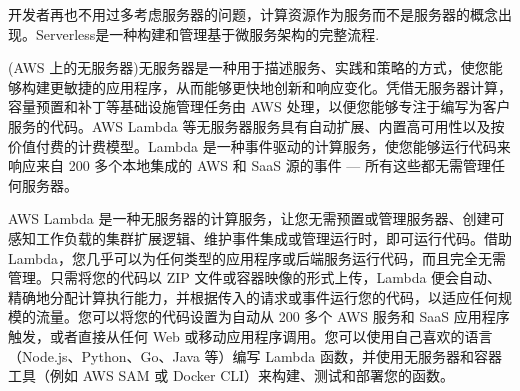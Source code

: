 \begin{definition}[Serverless]
    开发者再也不用过多考虑服务器的问题，计算资源作为服务而不是服务器的概念出现。Serverless是一种构建和管理基于微服务架构的完整流程.

    (AWS 上的无服务器)无服务器是一种用于描述服务、实践和策略的方式，使您能够构建更敏捷的应用程序，从而能够更快地创新和响应变化。凭借无服务器计算，容量预置和补丁等基础设施管理任务由 AWS 处理，以便您能够专注于编写为客户服务的代码。AWS Lambda 等无服务器服务具有自动扩展、内置高可用性以及按价值付费的计费模型。Lambda 是一种事件驱动的计算服务，使您能够运行代码来响应来自 200 多个本地集成的 AWS 和 SaaS 源的事件 — 所有这些都无需管理任何服务器。
\end{definition}

\begin{definition}
    AWS Lambda 是一种无服务器的计算服务，让您无需预置或管理服务器、创建可感知工作负载的集群扩展逻辑、维护事件集成或管理运行时，即可运行代码。借助 Lambda，您几乎可以为任何类型的应用程序或后端服务运行代码，而且完全无需管理。只需将您的代码以 ZIP 文件或容器映像的形式上传，Lambda 便会自动、精确地分配计算执行能力，并根据传入的请求或事件运行您的代码，以适应任何规模的流量。您可以将您的代码设置为自动从 200 多个 AWS 服务和 SaaS 应用程序触发，或者直接从任何 Web 或移动应用程序调用。您可以使用自己喜欢的语言（Node.js、Python、Go、Java 等）编写 Lambda 函数，并使用无服务器和容器工具（例如 AWS SAM 或 Docker CLI）来构建、测试和部署您的函数。
\end{definition}

